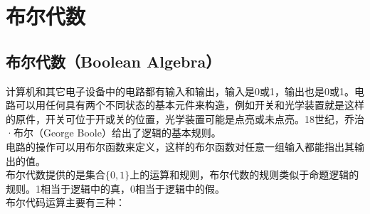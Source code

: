 \documentclass[12pt, openany, oneside]{book}
\begin{document}
\section{布尔代数}

\subsection{布尔代数（Boolean Algebra）}

计算机和其它电子设备中的电路都有输入和输出，输入是0或1，输出也是0或1。电路可以用任何具有两个不同状态的基本元件来构造，例如开关和光学装置就是这样的原件，开关可位于开或关的位置，光学装置可能是点亮或未点亮。18世纪，乔治·布尔（George Boole）给出了逻辑的基本规则。\\

电路的操作可以用布尔函数来定义，这样的布尔函数对任意一组输入都能指出其输出的值。\\

布尔代数提供的是集合$ \{0, 1\} $上的运算和规则，布尔代数的规则类似于命题逻辑的规则。1相当于逻辑中的真，0相当于逻辑中的假。\\

布尔代码运算主要有三种：
\end{document}

